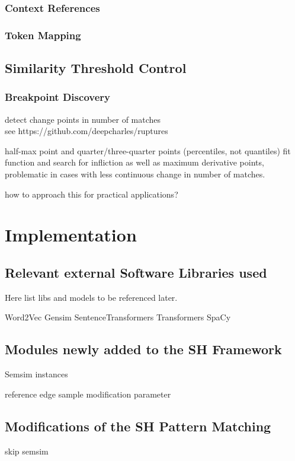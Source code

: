 \documentclass[11pt]{scrreprt}
\begin{document}
\subsection{Context References}
\subsection{Token Mapping}



\section{Similarity Threshold Control}

\subsection{Breakpoint Discovery}
detect change points in number of matches \\ 
see https://github.com/deepcharles/ruptures

half-max point and quarter/three-quarter points (percentiles, not quantiles)
fit function and search for infliction as well as maximum derivative points,
problematic in cases with less continuous change in number of matches.

how to approach this for practical applications?


\chapter{Implementation}
\label{cha:implementation}

\section{Relevant external Software Libraries used}
Here list libs and models to be referenced later.

Word2Vec
Gensim
SentenceTransformers
Transformers
SpaCy

\section{Modules newly added to the SH Framework}
Semsim instances

reference edge sample modification parameter


\section{Modifications of the SH Pattern Matching}
skip semsim
\end{document}
